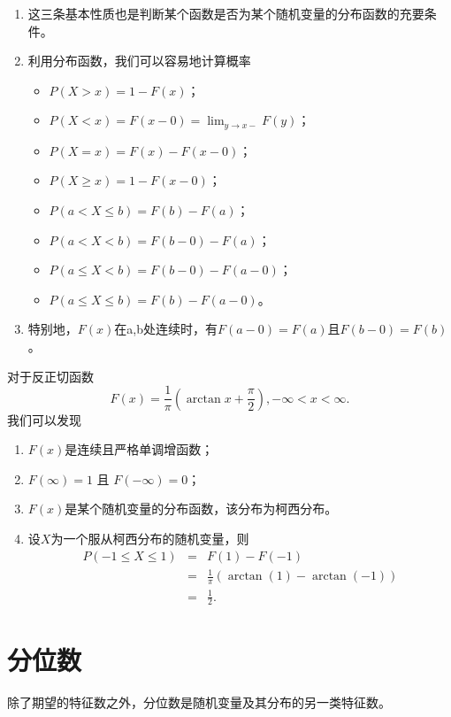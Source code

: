 \begin{remark}
    \begin{enumerate}
        \item 这三条基本性质也是判断某个函数是否为某个随机变量的分布函数的充要条件。
        \item 利用分布函数，我们可以容易地计算概率
        \begin{itemize}
            \item $P(X>x) = 1-F(x)$；
            \item $P(X<x) = F(x-0) = \lim_{y\rightarrow x-} F(y)$；
            \item $P(X=x) = F(x)-F(x-0)$；
            \item $P(X\geq x) = 1- F(x-0)$；
            \item $P(a< X\leq b) =F(b)-F(a)$；
            \item $P(a<X<b) = F(b-0)-F(a)$；
            \item $P(a\leq X<b) = F(b-0) - F(a-0)$；
            \item $P(a\leq X\leq b) = F(b) - F(a-0)$。
        \end{itemize}
        \item 特别地，$F(x)$在a,b处连续时，有$F(a-0) = F(a)$且$F(b-0) =F(b)$。
    \end{enumerate}
\end{remark}
\begin{example}
    对于反正切函数
$$F(x)=\frac{1}{\pi}\left(\arctan x+\frac{\pi}{2}\right),-\infty<x<\infty.$$
我们可以发现
\begin{enumerate}
    \item $F(x)$是连续且严格单调增函数；
    \item $F(\infty) = 1$ 且 $F(-\infty) = 0$；
    \item $F(x)$是某个随机变量的分布函数，该分布为柯西分布。
    \item 设$X$为一个服从柯西分布的随机变量，则
    \begin{eqnarray*}
        P(-1\leq X \leq 1) &=& F(1) - F(-1) \\&=& \frac{1}{\pi}\left(\arctan(1) - \arctan(-1)\right)\\
        &=&\frac{1}{2}.
    \end{eqnarray*}
\end{enumerate}
\end{example}

\section{分位数}
除了期望的特征数之外，分位数是随机变量及其分布的另一类特征数。

